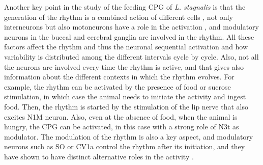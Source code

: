 Another key point in the study of the feeding CPG of \textit{L. stagnalis} is that the generation of the rhythm is a combined action of different cells \parencite{benjamin_distributed_2012}, not only interneurons but also motoneurons have a role in the activation \parencite{staras_patterngenerating_1998}, and modulatory neurons in the buccal and cerebral ganglia are involved in the rhythm. All these factors affect the rhythm and thus the neuronal sequential activation and how variability is distributed among the different intervals cycle by cycle. Also, not all the neurons are involved every time the rhythm is active, and that gives also information about the different contexts in which the rhythm evolves. For example, the rhythm can be activated by the presence of food or sucrose stimulation, in which case the animal needs to initiate the activity and ingest food. Then, the rhythm is started by the stimulation of the lip nerve that also excites N1M neuron. Also, even at the absence of food, when the animal is hungry, the CPG can be activated, in this case with a strong role of N3t as modulator. The modulation of the rhythm is also a key aspect, and modulatory neurons such as SO or CV1a control the rhythm after its initiation, and they have shown to have distinct alternative roles in the activity \parencite{kemenes_multiple_2001}. 

